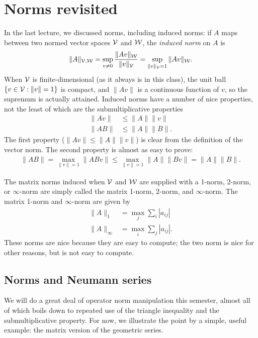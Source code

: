 \documentclass[12pt, leqno]{article}
\begin{document}

\section*{Norms revisited}

In the last lecture, we discussed norms, including induced norms:
if $A$ maps between two normed vector spaces $\mathcal{V}$ and $\mathcal{W}$,
the {\em induced norm} on $A$ is
\[
  \|A\|_{\mathcal{V},\mathcal{W}}
  = \sup_{v \neq 0} \frac{ \|Av\|_{\mathcal{W}} }{ \|v\|_{\mathcal{V}} }
  = \sup_{\|v\|_{\mathcal{V}} = 1} \|Av\|_{\mathcal{W}}.
\]
When $\mathcal{V}$ is finite-dimensional (as it always is in this class),
the unit ball $\{v \in \mathcal{V} : \|v\| = 1\}$ is compact, and $\|Av\|$
is a continuous function of $v$, so the supremum is actually attained.
Induced norms have a number of nice properties, not the least of
which are the submultiplicative properties
\begin{align*}
  \|Av\| & \leq \|A\| \|v\| \\
  \|AB\| & \leq \|A\| \|B\|.
\end{align*}
The first property ($\|Av\| \leq \|A\| \|v\|$) is clear from the
definition of the vector norm.  The second property is almost as easy
to prove:
\begin{align*}
  \|AB\| =    \max_{\|v\| = 1} \|ABv\| 
         \leq \max_{\|v\| = 1} \|A\| \|Bv\|
         = \|A\| \|B\|.
\end{align*}

The matrix norms induced when $\mathcal{V}$ and $\mathcal{W}$ are supplied with a 1-norm,
2-norm, or $\infty$-norm are simply called the matrix 1-norm, 2-norm,
and $\infty$-norm.  The matrix 1-norm and $\infty$-norm are given by
\begin{align*}
  \|A\|_1       &= \max_{j} \sum_{i} |a_{ij}| \\
  \|A\|_{\infty} &= \max_{i} \sum_{j} |a_{ij}|.
\end{align*}
These norms are nice because they are easy to compute; the two norm
is nice for other reasons, but is not easy to compute.

\subsection*{Norms and Neumann series}

We will do a great deal of operator norm manipulation this semester,
almost all of which boils down to repeated use of the triangle
inequality and the submultiplicative property.  For now, we illustrate
the point by a simple, useful example: the matrix version of
the geometric series.
\end{document}
